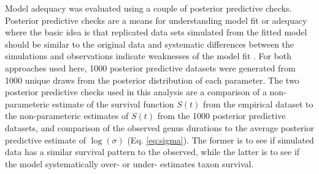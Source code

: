 \documentclass{article}
\begin{document}
%
%
%

Model adequacy was evaluated using a couple of posterior predictive checks. Posterior predictive checks are a means for understanding model fit or adequacy where the basic idea is that replicated data sets simulated from the fitted model should be similar to the original data and systematic differences between the simulations and observations indicate weaknesses of the model fit \citep{Gelman2013d}. For both approaches used here, 1000 posterior predictive datasets were generated from 1000 unique draws from the posterior distribution of each parameter. The two posterior predictive checks used in this analysis are a comparison of a non-parameteric estimate of the survival function \(S(t)\) from the empirical dataset to the non-parameteric estimates of \(S(t)\) from the 1000 posterior predictive datasets, and comparison of the observed genus durations to the average posterior predictive estimate of \(\log(\sigma)\) (Eq. \ref{eq:sigma}). The former is to see if simulated data has a similar survival pattern to the observed, while the latter is to see if the model systematically over- or under- estimates taxon survival.
\end{document}
